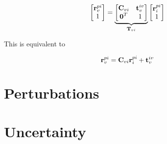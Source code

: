 \begin{equation}
	\begin{bmatrix} \boldsymbol{\mathbf{r}}^{pi}_v \\ 1 \end{bmatrix} = \underbrace{\begin{bmatrix} \boldsymbol{\mathbf{C}}_{vi} & \boldsymbol{\mathbf{t}}_v^{iv} \\ \boldsymbol{\mathbf{0}}^T & 1 \end{bmatrix}}_{\boldsymbol{\mathbf{T}}_{vi}} \begin{bmatrix} \boldsymbol{\mathbf{r}}^{pi}_i \\ 1 \end{bmatrix}
\end{equation}



This is equivalent to  

\begin{equation}
 \boldsymbol{\mathbf{r}}^{pi}_v =  \boldsymbol{\mathbf{C}}_{vi} \boldsymbol{\mathbf{r}}^{pi}_i + \boldsymbol{\mathbf{t}}_v^{iv}  
 \end{equation}









%
%

\section{Perturbations}



\section{Uncertainty}


 
